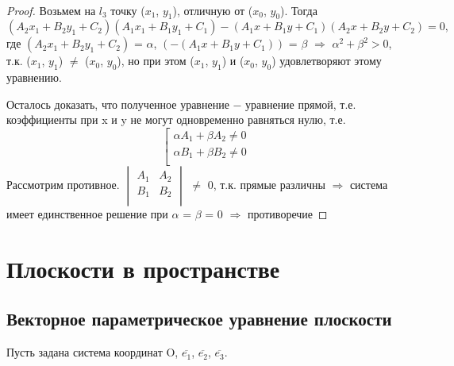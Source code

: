 \tab\\

\begin{proof}
    Возьмем на $l_3$ точку ($x_1$, $y_1$), отличную от ($x_0$, $y_0$).
    Тогда
    \[
    (A_2 x_1 + B_2 y_1 + C_2)(A_1 x_1 + B_1 y_1 + C_1) - (A_1 x + B_1 y + C_1)(A_2 x + B_2 y + C_2) = 0,
    \]
    где $(A_2 x_1 + B_2 y_1 + C_2)$ = $\alpha$, $(-(A_1 x + B_1 y + C_1))$ = $\beta$ $\Longrightarrow$ $\alpha^2 + \beta^2 > 0$, т.к. ($x_1$, $y_1$) $\neq$ ($x_0$, $y_0$), но при этом ($x_1$, $y_1$) и ($x_0$, $y_0$) удовлетворяют этому уравнению.

    Осталось доказать, что полученное уравнение $-$ уравнение прямой, т.е. коэффициенты при x и y не могут одновременно равняться нулю, т.е.
    \[
    \left[
        \begin{gathered}
            \alpha A_1 + \beta A_2 \neq 0\\
            \alpha B_1 + \beta B_2 \neq 0\\
        \end{gathered}
    \right.
    \]
    Рассмотрим противное.
    $\begin{vmatrix}
        A_1 & A_2\\
        B_1 & B_2\\
    \end{vmatrix}$ $\neq$ 0, т.к. прямые различны $\Longrightarrow$ система имеет единственное решение при $\alpha$ = $\beta$ = 0 $\Longrightarrow$ противоречие
\end{proof}
\section{Плоскости в пространстве}

\subsection{Векторное параметрическое уравнение плоскости}

Пусть задана система координат O, $\overline{e_1}$, $\overline{e_2}$, $\overline{e_3}$.

